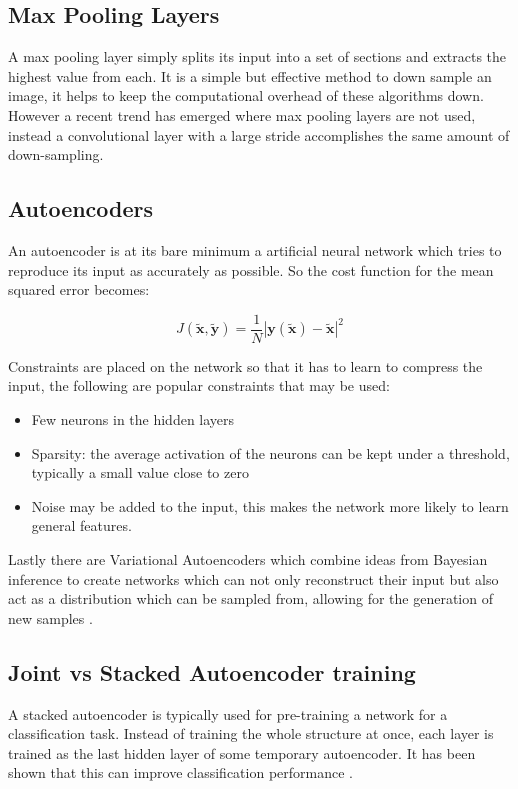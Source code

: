     \subsection{Max Pooling Layers}
      A max pooling layer simply splits its input into a set of sections and extracts
      the highest value from each. It is a simple but effective method to down sample
      an image, it helps to keep the computational overhead of these algorithms
      down. However a recent trend \cite{Springenberg2015} has emerged where max pooling
      layers are not used, instead a convolutional layer with a large stride accomplishes
      the same amount of down-sampling.
    \subsection{Autoencoders}
      An autoencoder is at its bare minimum a artificial neural network which tries
      to reproduce its input as accurately as possible. So the cost function for the mean squared error becomes:

      \begin{equation} \label{eq:autoencoder_cost}
        J(\tilde{\mathbf{x}},\tilde{\mathbf{y}}) = \frac{1}{N}\left |\mathbf{y}(\tilde{\mathbf{x}})-\tilde{\mathbf{x}}\right | ^2
      \end{equation}

      Constraints are
      placed on the network so that it has to learn to compress the input, the following
      are popular constraints that may be used:
      \begin{itemize}
        \item Few neurons in the hidden layers
        \item Sparsity: the average activation of the neurons can be kept under a
        threshold, typically a small value close to zero \cite{autong}
        \item Noise may be added to the input, this makes the network more likely
        to learn general features.
      \end{itemize}
      Lastly there are Variational Autoencoders which combine ideas from Bayesian inference
      to create networks which can not only reconstruct their input but also act as a
      distribution which can be sampled from, allowing for the generation of new samples \cite{Kingma2013}.

    \subsection{Joint vs Stacked Autoencoder training}
      A stacked autoencoder is typically used for pre-training a network for a classification task.
      Instead of training the whole structure at once, each layer is trained as the last hidden
      layer of some temporary autoencoder. It has been shown that this can improve classification performance \cite{stacks}.
